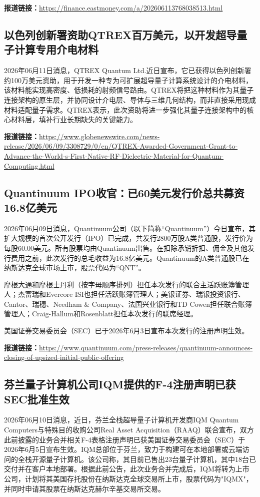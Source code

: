 \documentclass[12pt,a4paper]{ctexart}
\begin{document}
\noindent\textbf{报道链接：}\url{https://finance.eastmoney.com/a/202606113768038513.html}

\subsection{ 以色列创新署资助QTREX百万美元，以开发超导量子计算专用介电材料 }

2026年06月11日消息，QTREX Quantum Ltd.近日宣布，它已获得以色列创新署约100万美元资助，用于开发一种专为可扩展超导量子计算系统设计的介电材料，该材料能实现高密度、低损耗的射频信号路由。QTREX将把这种材料作为其量子连接架构的原生层，并协同设计介电层、导体与三维几何结构，而非直接采用现成材料适配量子需求。QTREX表示，此次资助将进一步强化其量子连接架构中的核心材料层，填补行业长期缺失的关键能力。

\noindent\textbf{报道链接：}\url{https://www.globenewswire.com/news-release/2026/06/09/3308729/0/en/QTREX-Awarded-Government-Grant-to-Advance-the-World-s-First-Native-RF-Dielectric-Material-for-Quantum-Computing.html}

\subsection{ Quantinuum IPO收官：已60美元发行价总共募资16.8亿美元 }

2026年06月09日消息，Quantinuum公司（以下简称“Quantinuum”）今日宣布，其扩大规模的首次公开发行（IPO）已完成，共发行2800万股A类普通股，发行价为每股60.00美元。所有股票均由Quantinuum出售。在扣除承销折扣、佣金及其他发行费用之前，此次发行的总毛收益为16.8亿美元。Quantinuum的A类普通股已在纳斯达克全球市场上市，股票代码为“QNT”。

摩根大通和摩根士丹利（按字母顺序排列）担任本次发行的联合主活跃账簿管理人；杰富瑞和Evercore ISI也担任活跃账簿管理人；美银证券、瑞银投资银行、Cantor、瑞穗、Needham \& Company、法国兴业银行和TD Cowen担任联合账簿管理人；Craig-Hallum和Rosenblatt担任本次发行的联席经理。

美国证券交易委员会（SEC）已于2026年6月3日宣布本次发行的注册声明生效。

\noindent\textbf{报道链接：}\url{https://www.quantinuum.com/press-releases/quantinuum-announces-closing-of-upsized-initial-public-offering}

\subsection{ 芬兰量子计算机公司IQM提供的F-4注册声明已获SEC批准生效 }

2026年06月10日消息，近日，芬兰全栈超导量子计算机开发商IQM Quantum Computers与特殊目的收购公司Real Asset Acquisition（RAAQ）联合宣布，双方此前披露的业务合并相关F-4表格注册声明已获美国证券交易委员会（SEC）于2026年6月5日宣布生效。IQM总部位于芬兰，致力于构建可在本地部署或云端访问的全栈开源量子计算机。该公司称，其目前已售出23台量子计算机，其中18台已交付并在客户本地部署。根据此前公告，此次业务合并完成后，IQM将转为上市公司，计划将其美国存托股份在纳斯达克全球交易所上市，股票代码为"IQMX"，并同时申请其股票在纳斯达克赫尔辛基交易所交易。
\end{document}
